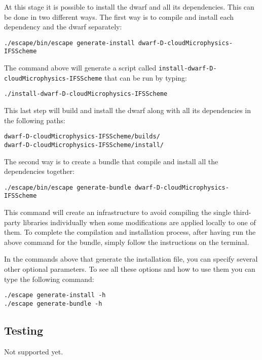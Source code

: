 \documentclass[
a4paper,     %
12pt,        %
article,
onecolumn,   %
openany,     %
]{memoir}
\newcommand{\inlsh}[1]{\texttt{#1}}
\newcommand{\inlsh}[1]{\tikz[anchor=base,baseline]\node[inner sep=2pt,
outer sep=0,draw=yellow!10,fill=yellow!10]{\texttt{#1}};}
\begin{document}
At this stage it is possible to install the dwarf 
and all its dependencies. This can be done in two 
different ways. The first way is to compile and 
install each dependency and the dwarf separately:
%
\begin{lstlisting}[style=BashStyle]
./escape/bin/escape generate-install dwarf-D-cloudMicrophysics-IFSScheme
\end{lstlisting}
% 
The command above will generate a script 
called \inlsh{install-dwarf-D-cloudMicrophysics-IFSScheme} 
that can be run by typing:
%
\begin{lstlisting}[style=BashStyle]
./install-dwarf-D-cloudMicrophysics-IFSScheme
\end{lstlisting}
%
This last step will build and install the dwarf 
along with all its dependencies in the following 
paths:
%
\begin{lstlisting}[style=BashStyle]
dwarf-D-cloudMicrophysics-IFSScheme/builds/
dwarf-D-cloudMicrophysics-IFSScheme/install/
\end{lstlisting}
%

The second way is to create a bundle that compile 
and install all the dependencies together:
%
\begin{lstlisting}[style=BashStyle]
./escape/bin/escape generate-bundle dwarf-D-cloudMicrophysics-IFSScheme
\end{lstlisting}
% 
This command will create an infrastructure to avoid
compiling the single third-party libraries individually
when some modifications are applied locally to one of 
them. To complete the compilation and installation process, 
after having run the above command for the bundle, simply 
follow the instructions on the terminal.

In the commands above that generate the installation 
file, you can specify several other optional parameters. 
To see all these options and how to use them you 
can type the following command:
%
\begin{lstlisting}[style=BashStyle]
./escape generate-install -h
./escape generate-bundle -h
\end{lstlisting}
%

\subsection{Testing}
Not supported yet.

\end{document}
